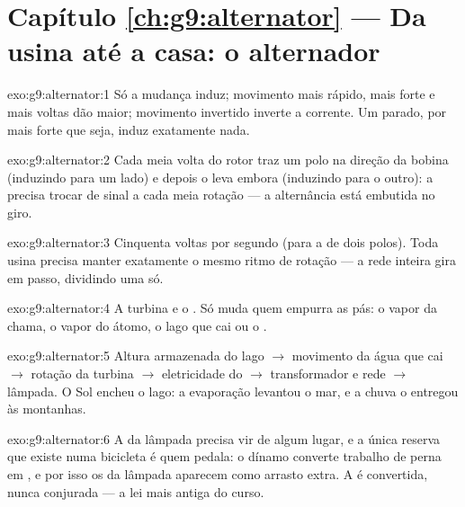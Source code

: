 \section*{Capítulo \ref{ch:g9:alternator} --- Da usina até a casa: o alternador}

\begin{solution}{exo:g9:alternator:1}
Só a mudança induz; movimento mais rápido,  mais forte e mais
voltas dão  maior; movimento invertido inverte a corrente. Um
 parado, por mais forte que seja, induz exatamente nada.
\end{solution}

\begin{solution}{exo:g9:alternator:2}
Cada meia volta do rotor traz um polo na direção da bobina (induzindo
para um lado) e depois o leva embora (induzindo para o outro): a
 precisa trocar de sinal a cada meia rotação --- a alternância
está embutida no giro.
\end{solution}

\begin{solution}{exo:g9:alternator:3}
Cinquenta voltas por segundo (para a  de dois polos).
Toda usina precisa manter exatamente o mesmo ritmo de rotação --- a
rede inteira gira em passo, dividindo uma  só.
\end{solution}

\begin{solution}{exo:g9:alternator:4}
A turbina e o . Só muda quem empurra as pás: o vapor da
chama, o vapor do átomo, o lago que cai ou o .
\end{solution}

\begin{solution}{exo:g9:alternator:5}
Altura armazenada do lago $\to$ movimento da água que cai $\to$
rotação da turbina $\to$ eletricidade do  $\to$
transformador e rede $\to$ lâmpada. O Sol encheu o lago: a evaporação
levantou o mar, e a chuva o entregou às montanhas.
\end{solution}

\begin{solution}{exo:g9:alternator:6}
A  da lâmpada precisa vir de algum lugar, e a única reserva
que existe numa bicicleta é quem pedala: o dínamo converte trabalho
de perna em , e por isso os  da lâmpada aparecem como
arrasto extra. A  é convertida, nunca conjurada --- a lei mais
antiga do curso.
\end{solution}


